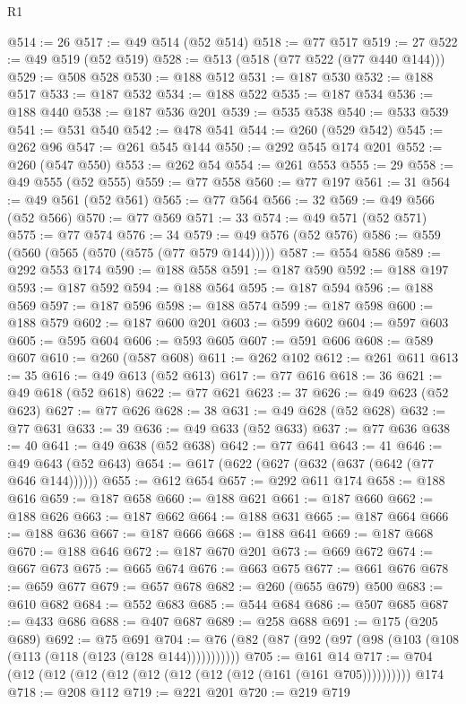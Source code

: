 \begin{lexlean}{R1}
\begin{coremodule}
@514 := 26
@517 := @49 @514 (@52 @514)
@518 := @77 @517
@519 := 27
@522 := @49 @519 (@52 @519)
@528 := @513 (@518 (@77 @522 (@77 @440 @144)))
@529 := @508 @528
@530 := @188 @512
@531 := @187 @530
@532 := @188 @517
@533 := @187 @532
@534 := @188 @522
@535 := @187 @534
@536 := @188 @440
@538 := @187 @536 @201
@539 := @535 @538
@540 := @533 @539
@541 := @531 @540
@542 := @478 @541
@544 := @260 (@529 @542)
@545 := @262 @96
@547 := @261 @545 @144
@550 := @292 @545 @174 @201
@552 := @260 (@547 @550)
@553 := @262 @54
@554 := @261 @553
@555 := 29
@558 := @49 @555 (@52 @555)
@559 := @77 @558
@560 := @77 @197
@561 := 31
@564 := @49 @561 (@52 @561)
@565 := @77 @564
@566 := 32
@569 := @49 @566 (@52 @566)
@570 := @77 @569
@571 := 33
@574 := @49 @571 (@52 @571)
@575 := @77 @574
@576 := 34
@579 := @49 @576 (@52 @576)
@586 := @559 (@560 (@565 (@570 (@575 (@77 @579 @144)))))
@587 := @554 @586
@589 := @292 @553 @174
@590 := @188 @558
@591 := @187 @590
@592 := @188 @197
@593 := @187 @592
@594 := @188 @564
@595 := @187 @594
@596 := @188 @569
@597 := @187 @596
@598 := @188 @574
@599 := @187 @598
@600 := @188 @579
@602 := @187 @600 @201
@603 := @599 @602
@604 := @597 @603
@605 := @595 @604
@606 := @593 @605
@607 := @591 @606
@608 := @589 @607
@610 := @260 (@587 @608)
@611 := @262 @102
@612 := @261 @611
@613 := 35
@616 := @49 @613 (@52 @613)
@617 := @77 @616
@618 := 36
@621 := @49 @618 (@52 @618)
@622 := @77 @621
@623 := 37
@626 := @49 @623 (@52 @623)
@627 := @77 @626
@628 := 38
@631 := @49 @628 (@52 @628)
@632 := @77 @631
@633 := 39
@636 := @49 @633 (@52 @633)
@637 := @77 @636
@638 := 40
@641 := @49 @638 (@52 @638)
@642 := @77 @641
@643 := 41
@646 := @49 @643 (@52 @643)
@654 := @617 (@622 (@627 (@632 (@637 (@642 (@77 @646 @144))))))
@655 := @612 @654
@657 := @292 @611 @174
@658 := @188 @616
@659 := @187 @658
@660 := @188 @621
@661 := @187 @660
@662 := @188 @626
@663 := @187 @662
@664 := @188 @631
@665 := @187 @664
@666 := @188 @636
@667 := @187 @666
@668 := @188 @641
@669 := @187 @668
@670 := @188 @646
@672 := @187 @670 @201
@673 := @669 @672
@674 := @667 @673
@675 := @665 @674
@676 := @663 @675
@677 := @661 @676
@678 := @659 @677
@679 := @657 @678
@682 := @260 (@655 @679) @500
@683 := @610 @682
@684 := @552 @683
@685 := @544 @684
@686 := @507 @685
@687 := @433 @686
@688 := @407 @687
@689 := @258 @688
@691 := @175 (@205 @689)
@692 := @75 @691
@704 := @76 (@82 (@87 (@92 (@97 (@98 (@103 (@108 (@113 (@118 (@123 (@128 @144)))))))))))
@705 := @161 @14
@717 := @704 (@12 (@12 (@12 (@12 (@12 (@12 (@12 (@12 (@161 (@161 @705)))))))))) @174
@718 := @208 @112
@719 := @221 @201
@720 := @219 @719

\end{coremodule}
\end{lexlean}
